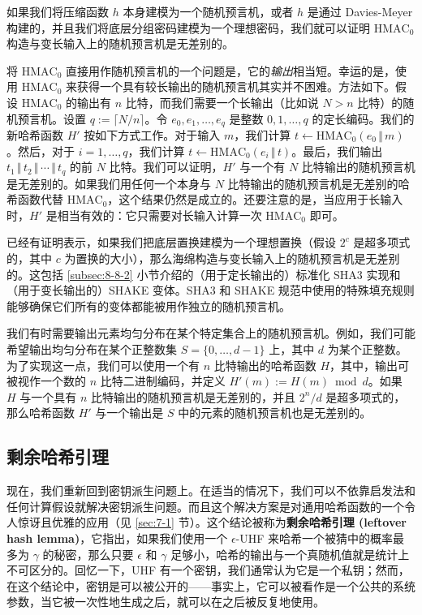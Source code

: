 \begin{snote}[一些安全的模式。]
如果我们将压缩函数 $h$ 本身建模为一个随机预言机，或者 $h$ 是通过 Davies-Meyer 构建的，并且我们将底层分组密码建模为一个理想密码，我们就可以证明 $\mathrm{HMAC}_0$ 构造与变长输入上的随机预言机是无差别的。

将 $\mathrm{HMAC}_0$ 直接用作随机预言机的一个问题是，它的\emph{输出}相当短。幸运的是，使用 $\mathrm{HMAC}_0$ 来获得一个具有较长输出的随机预言机其实并不困难。方法如下。假设 $\mathrm{HMAC}_0$ 的输出有 $n$ 比特，而我们需要一个长输出（比如说 $N>n$ 比特）的随机预言机。设置 $q:=\lceil N/n\rceil$。令 $e_0,e_1,\dots,e_q$ 是整数 $0,1,\dots,q$ 的定长编码。我们的新哈希函数 $H'$ 按如下方式工作。对于输入 $m$，我们计算 $t\leftarrow\mathrm{HMAC}_0(e_0\,\Vert\,m)$。然后，对于 $i=1,\dots,q$，我们计算 $t\leftarrow\mathrm{HMAC}_0(e_i\,\Vert\,t)$。最后，我们输出 $t_1\,\Vert\,t_2\,\Vert\,\cdots\,\Vert\,t_q$ 的前 $N$ 比特。我们可以证明，$H'$ 与一个有 $N$ 比特输出的随机预言机是无差别的。如果我们用任何一个本身与 $N$ 比特输出的随机预言机是无差别的哈希函数代替 $\mathrm{HMAC}_0$，这个结果仍然是成立的。还要注意的是，当应用于长输入时，$H'$ 是相当有效的：它只需要对长输入计算一次 $\mathrm{HMAC}_0$ 即可。

已经有证明表示，如果我们把底层置换建模为一个理想置换（假设 $2^c$ 是超多项式的，其中 $c$ 为置换的大小），那么海绵构造与变长输入上的随机预言机是无差别的。这包括 \ref{subsec:8-8-2} 小节介绍的（用于定长输出的）标准化 SHA3 实现和（用于变长输出的）SHAKE 变体。SHA3 和 SHAKE 规范中使用的特殊填充规则能够确保它们所有的变体都能被用作独立的随机预言机。

我们有时需要输出元素均匀分布在某个特定集合上的随机预言机。例如，我们可能希望输出均匀分布在某个正整数集 $S=\{0,\dots,d-1\}$ 上，其中 $d$ 为某个正整数。为了实现这一点，我们可以使用一个有 $n$ 比特输出的哈希函数 $H$，其中，输出可被视作一个数的 $n$ 比特二进制编码，并定义 $H'(m):=H(m) \bmod d$。如果 $H$ 与一个具有 $n$ 比特输出的随机预言机是无差别的，并且 $2^n/d$ 是超多项式的，那么哈希函数 $H'$ 与一个输出是 $S$ 中的元素的随机预言机也是无差别的。
\end{snote}

\subsection{剩余哈希引理}\label{subsec:8-10-4}

现在，我们重新回到密钥派生问题上。在适当的情况下，我们可以不依靠启发法和任何计算假设就解决密钥派生问题。而且这个解决方案是对通用哈希函数的一个令人惊讶且优雅的应用（见 \ref{sec:7-1} 节）。这个结论被称为\textbf{剩余哈希引理 (leftover hash lemma)}，它指出，如果我们使用一个 $\epsilon$-UHF 来哈希一个被猜中的概率最多为 $\gamma$ 的秘密，那么只要 $\epsilon$ 和 $\gamma$ 足够小，哈希的输出与一个真随机值就是统计上不可区分的。回忆一下，UHF 有一个密钥，我们通常认为它是一个私钥；然而，在这个结论中，密钥是可以被公开的——事实上，它可以被看作是一个公共的系统参数，当它被一次性地生成之后，就可以在之后被反复地使用。

